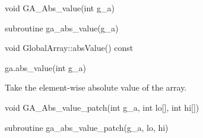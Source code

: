 \documentclass[12pt]{article}
\begin{document}

\begin{capi}
\begin{ccode}
void GA_Abs_value(int g_a)
\end{ccode}
\begin{funcargs}
\end{funcargs}
\end{capi}

\begin{fapi}
\begin{fcode}
subroutine ga_abs_value(g_a)
\end{fcode}
\begin{funcargs}
\end{funcargs}
\end{fapi}

\begin{cxxapi}
\begin{cxxcode}
void GlobalArray::absValue() const
\end{cxxcode}
\end{cxxapi}

\begin{pyapi}
\begin{pycode}
ga.abs_value(int g_a)
\end{pycode}
\begin{funcargs}
\end{funcargs}
\end{pyapi}

\gcoll

\begin{desc}
Take the element-wise absolute value of the array.
\end{desc}


\begin{capi}
\begin{ccode}
void GA_Abs_value_patch(int g_a, int lo[], int hi[])
\end{ccode}
\begin{funcargs}
\end{funcargs}
\end{capi}

\begin{fapi}
\begin{fcode}
subroutine ga_abs_value_patch(g_a, lo, hi)
\end{fcode}
\begin{funcargs}
\end{funcargs}
\end{fapi}
\end{document}
